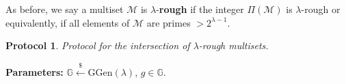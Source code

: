 \documentclass[11pt, lettersize, notitlepage, leqno, footskip=0.6cm]{article}
\newcommand{\bz}{\mathbb Z}
\newcommand{\slim}{\sum\limits}
\newcommand{\ttt}{\texttt}
\newcommand{\negl}{\ttt{{negl}}}
\newcommand{\imp}{\Longrightarrow}
\newcommand{\wti}{\widetilde}
\newcommand{\mc}{\mathcal}
\newcommand{\mb}{\mathbb}
\newcommand{\mbf}{\mathbf}
\newcommand{\mr}{\mathrm}
\newcommand{\lam}{\lambda}
\newcommand{\lamb}{\lambda}
\newcommand{\mcM}{\mc{M}}
\newcommand{\vs}{\vspace{-0.15cm}}
\newcommand{\noin}{\noindent}
\newcommand{\Mod}[1]{\ (\mathrm{mod}\ #1)}
\newcommand{\GCD}{\mbf{gcd}}
\newtheorem{Prot}[Thm]{Protocol}
\numberwithin{equation}{section}
\begin{document}
\begin{comment}
However, this is no longer true when the integers $\Pi(\mcM_i)$ have prime divisors of bit-size $< \lam$. While such a protocol would be \textit{sound} in the sense that a Prover could not forge a fake proof, it would not be \textit{correct}, meaning an honest Prover might not be able to efficiently generate a proof. To get around this problem, we use lemma 2.3. 

For an arbitrary $\lam$-bit integer $\gamma$, consider the integer $\slim_{i=1}^n d_i^{n\lam}\gamma^i.$ If the Prover can demonstrate that $\GCD(\slim_{i=1}^n d_i^{n\lam}\gamma^i, d_i)= 1$, then it follows that $\GCD(d_1,\cdots,d_n) = 1$. So it boils down to the expected runtime for finding such an integer $\gamma$. 

For a randomly chosen $\gamma$, suppose we have \vs $$ e:= \GCD(\slim_{i=1}^n d_i\gamma^i, d_1) > 1 .$$ Let $p$ be any prime divisor of $e$. Since $p$ does not divide all of the coefficients of the polynomial $\slim_{i=1}^n d_i^{n\lam}X_i\in\bz[X]$, it follows that \vspace{-0.25cm} $$\mbf{Prob}\big(\slim_{i=1}^n d_i\gamma^i \equiv 0\Mod{p^{n\lam}} \big) = \negl(\lam).$$ The Prover can efficiently compute \vs $$e:= \GCD(\slim_{i=1}^n d_i\gamma^i, d_1)\;,\;\wti{e}:= \GCD(\slim_{i=1}^n d_i\gamma^i, e^{n\lam}).$$ He sends the commitments to these integers and demonstrates the relations between the discrete logarithms using the protocols $\ttt{PoGCD}$ and $\ttt{MultPolyDlog}$. Now, $$e^{n\lam-1}\equiv 0\Mod{\wti{e}} \imp \GCD(d_1,\cdots,d_n) = 1.$$ To see this, let $p$ be a prime dividing $\GCD(d_1,\cdots,d_n)$ and let $k$ be the largest integer such that $p^k$ divides $e$. Then $p^{kn\lam}$ divides every $d_i^{n\lam}$ and hence, $p^{kn\lam}$ divides $\wti{e}$. On the other hand, $p^{kn\lam}$ does not divide $e^{n\lam-1}$, a contradiction.  \end{comment} 


As before, we say a multiset $\mcM$ is $\lam$-\textbf{rough} if the integer $\Pi(\mcM)$ is $\lam$-rough or equivalently, if all elements of $\mcM$ are primes $> 2^{\lam-1}$.

\begin{Prot} Protocol for the intersection of $\lam$-rough multisets.\end{Prot} \vspace{-0.3cm}

\noin \textbf{Parameters:} $\mb{G}\xleftarrow{\$} \mr{GGen}(\lamb)$,\; $g\in \mb{G}$.
\end{document}
